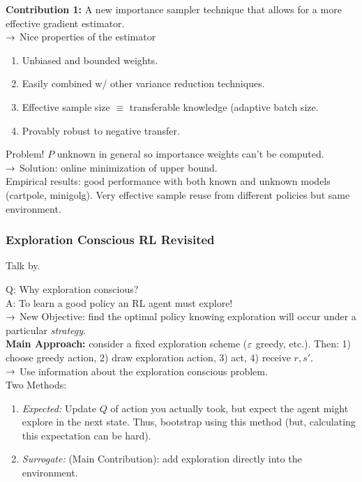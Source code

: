 {\bf Contribution 1:} A new importance sampler technique that allows for a more effective gradient estimator. \\

$\rightarrow$ Nice properties of the estimator
\begin{enumerate}
    \item Unbiased and bounded weights.
    \item Easily combined w/ other variance reduction techniques.
    \item Effective sample size $\equiv$ transferable knowledge (adaptive batch size.
    \item Provably robust to negative transfer.
\end{enumerate}

Problem! $P$ unknown in general so importance weights can't be computed. \\

$\rightarrow$ Solution: online minimization of upper bound. \\

Empirical results: good performance with both known and unknown models (cartpole, minigolg). Very effective sample reuse from different policies but same environment. \\

\spacerule

\subsubsection{Exploration Conscious RL Revisited}

Talk by.

Q: Why exploration conscious? \\

A: To learn a good policy an RL agent must explore! \\

$\rightarrow$ New Objective: find the optimal policy knowing exploration will occur under a particular {\it strategy}. \\

{\bf Main Approach:} consider a fixed exploration scheme ($\varepsilon$ greedy, etc.). Then: 1) choose greedy action, 2) draw exploration action, 3) act, 4) receive $r, s'$. \\

$\rightarrow$ Use information about the exploration conscious problem. \\

Two Methods:
\begin{enumerate}
    \item {\it Expected:} Update $Q$ of action you actually took, but expect the agent might explore in the next state. Thus, bootstrap using this method (but, calculating this expectation can be hard).
    \item {\it Surrogate:} (Main Contribution): add exploration directly into the environment.
\end{enumerate}

